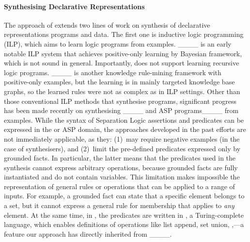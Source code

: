 



\paragraph{Synthesising Declarative Representations}

The approach of \tool extends two lines of work on synthesis of
declarative representations programs and data.
%
The first one is inductive logic programming (ILP), which aims to
learn logic programs from examples.
____ is an early notable ILP
system that achieves positive-only learning by Bayesian framework,
which is not sound in general. Importantly,  does not
support learning recursive logic programs.
%
____ is another knowledge rule-mining
framework with positive-only examples, but the learning is in
 mainly targeted knowledge base graphs, so the learned
rules were not as complex as in ILP settings.
%
Other than those conventional ILP methods that synthesise \prolog
programs, significant progress has been made recently on synthesising
____ and ASP
programs____ from
examples.
%
While the syntax of Separation Logic assertions and predicates can be
expressed in the  or ASP domain, the approaches
developed in the past efforts are not immediately applicable, as they:
(1)~may require negative examples (in the case of 
synthesisers), and (2)~limit the pre-defined predicates expressed only
by grounded facts.
%
In particular, the latter means that the predicates used in the
synthesis cannot express arbitrary operations, because grounded facts
are fully instantiated and do not contain variables. 
%
This limitation makes impossible the representation of general rules
or operations that can be applied to a range of inputs. For example, a
grounded fact can state that a specific element belongs to a set, but
it cannot express a general rule for membership that applies to
\emph{any} element. 
%
At the same time, in \tool, the predicates are written in \prolog, a
Turing-complete language, which enables definitions of operations like
list append, set union, \etc,---a feature our approach has directly
inherited from \popper____.

